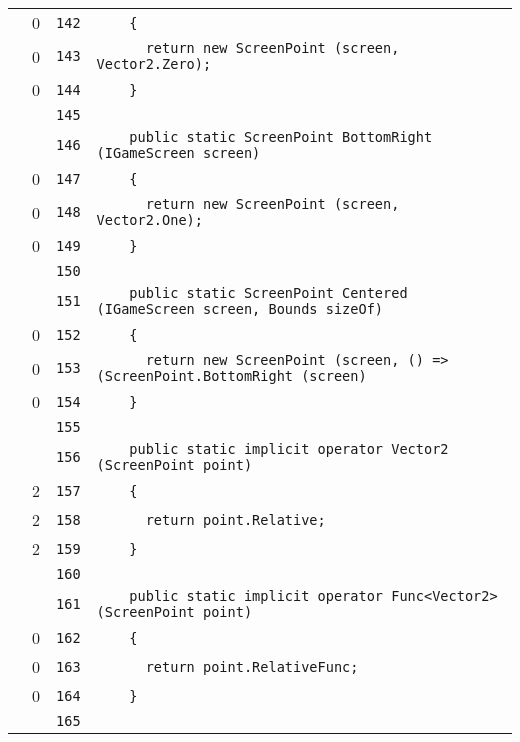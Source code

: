 \documentclass[a4paper,10pt]{article}
\begin{document}
\begin{longtable}[l]{lrrl}
\cellcolor{red} & 0 & \verb~142~ & \verb~    {~\\
\cellcolor{red} & 0 & \verb~143~ & \verb~      return new ScreenPoint (screen, Vector2.Zero);~\\
\cellcolor{red} & 0 & \verb~144~ & \verb~    }~\\
\cellcolor{gray} &  & \verb~145~ & \verb~~\\
\cellcolor{gray} &  & \verb~146~ & \verb~    public static ScreenPoint BottomRight (IGameScreen screen)~\\
\cellcolor{red} & 0 & \verb~147~ & \verb~    {~\\
\cellcolor{red} & 0 & \verb~148~ & \verb~      return new ScreenPoint (screen, Vector2.One);~\\
\cellcolor{red} & 0 & \verb~149~ & \verb~    }~\\
\cellcolor{gray} &  & \verb~150~ & \verb~~\\
\cellcolor{gray} &  & \verb~151~ & \verb~    public static ScreenPoint Centered (IGameScreen screen, Bounds sizeOf)~\\
\cellcolor{red} & 0 & \verb~152~ & \verb~    {~\\
\cellcolor{red} & 0 & \verb~153~ & \verb~      return new ScreenPoint (screen, () => (ScreenPoint.BottomRight (screen) ~\\
\cellcolor{red} & 0 & \verb~154~ & \verb~    }~\\
\cellcolor{gray} &  & \verb~155~ & \verb~~\\
\cellcolor{gray} &  & \verb~156~ & \verb~    public static implicit operator Vector2 (ScreenPoint point)~\\
\cellcolor{green} & 2 & \verb~157~ & \verb~    {~\\
\cellcolor{green} & 2 & \verb~158~ & \verb~      return point.Relative;~\\
\cellcolor{green} & 2 & \verb~159~ & \verb~    }~\\
\cellcolor{gray} &  & \verb~160~ & \verb~~\\
\cellcolor{gray} &  & \verb~161~ & \verb~    public static implicit operator Func<Vector2> (ScreenPoint point)~\\
\cellcolor{red} & 0 & \verb~162~ & \verb~    {~\\
\cellcolor{red} & 0 & \verb~163~ & \verb~      return point.RelativeFunc;~\\
\cellcolor{red} & 0 & \verb~164~ & \verb~    }~\\
\cellcolor{gray} &  & \verb~165~ & \verb~~\\

\end{longtable}
\end{document}
